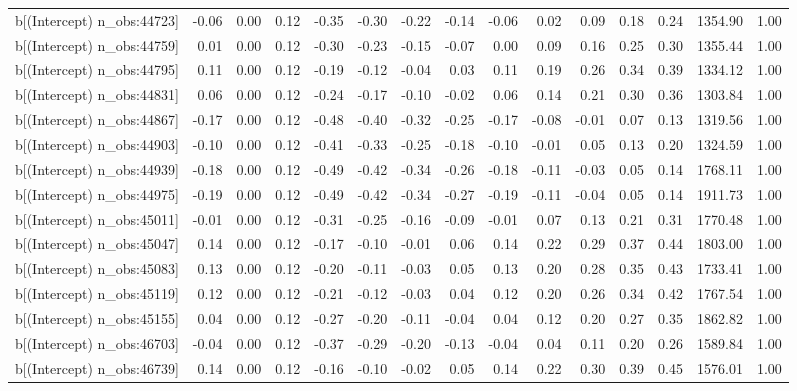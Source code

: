 \begin{table}[ht]
\begin{tabular}{rrrrrrrrrrrrrrr}
  b[(Intercept) n\_obs:44723] & -0.06 & 0.00 & 0.12 & -0.35 & -0.30 & -0.22 & -0.14 & -0.06 & 0.02 & 0.09 & 0.18 & 0.24 & 1354.90 & 1.00 \\ 
  b[(Intercept) n\_obs:44759] & 0.01 & 0.00 & 0.12 & -0.30 & -0.23 & -0.15 & -0.07 & 0.00 & 0.09 & 0.16 & 0.25 & 0.30 & 1355.44 & 1.00 \\ 
  b[(Intercept) n\_obs:44795] & 0.11 & 0.00 & 0.12 & -0.19 & -0.12 & -0.04 & 0.03 & 0.11 & 0.19 & 0.26 & 0.34 & 0.39 & 1334.12 & 1.00 \\ 
  b[(Intercept) n\_obs:44831] & 0.06 & 0.00 & 0.12 & -0.24 & -0.17 & -0.10 & -0.02 & 0.06 & 0.14 & 0.21 & 0.30 & 0.36 & 1303.84 & 1.00 \\ 
  b[(Intercept) n\_obs:44867] & -0.17 & 0.00 & 0.12 & -0.48 & -0.40 & -0.32 & -0.25 & -0.17 & -0.08 & -0.01 & 0.07 & 0.13 & 1319.56 & 1.00 \\ 
  b[(Intercept) n\_obs:44903] & -0.10 & 0.00 & 0.12 & -0.41 & -0.33 & -0.25 & -0.18 & -0.10 & -0.01 & 0.05 & 0.13 & 0.20 & 1324.59 & 1.00 \\ 
  b[(Intercept) n\_obs:44939] & -0.18 & 0.00 & 0.12 & -0.49 & -0.42 & -0.34 & -0.26 & -0.18 & -0.11 & -0.03 & 0.05 & 0.14 & 1768.11 & 1.00 \\ 
  b[(Intercept) n\_obs:44975] & -0.19 & 0.00 & 0.12 & -0.49 & -0.42 & -0.34 & -0.27 & -0.19 & -0.11 & -0.04 & 0.05 & 0.14 & 1911.73 & 1.00 \\ 
  b[(Intercept) n\_obs:45011] & -0.01 & 0.00 & 0.12 & -0.31 & -0.25 & -0.16 & -0.09 & -0.01 & 0.07 & 0.13 & 0.21 & 0.31 & 1770.48 & 1.00 \\ 
  b[(Intercept) n\_obs:45047] & 0.14 & 0.00 & 0.12 & -0.17 & -0.10 & -0.01 & 0.06 & 0.14 & 0.22 & 0.29 & 0.37 & 0.44 & 1803.00 & 1.00 \\ 
  b[(Intercept) n\_obs:45083] & 0.13 & 0.00 & 0.12 & -0.20 & -0.11 & -0.03 & 0.05 & 0.13 & 0.20 & 0.28 & 0.35 & 0.43 & 1733.41 & 1.00 \\ 
  b[(Intercept) n\_obs:45119] & 0.12 & 0.00 & 0.12 & -0.21 & -0.12 & -0.03 & 0.04 & 0.12 & 0.20 & 0.26 & 0.34 & 0.42 & 1767.54 & 1.00 \\ 
  b[(Intercept) n\_obs:45155] & 0.04 & 0.00 & 0.12 & -0.27 & -0.20 & -0.11 & -0.04 & 0.04 & 0.12 & 0.20 & 0.27 & 0.35 & 1862.82 & 1.00 \\ 
  b[(Intercept) n\_obs:46703] & -0.04 & 0.00 & 0.12 & -0.37 & -0.29 & -0.20 & -0.13 & -0.04 & 0.04 & 0.11 & 0.20 & 0.26 & 1589.84 & 1.00 \\ 
  b[(Intercept) n\_obs:46739] & 0.14 & 0.00 & 0.12 & -0.16 & -0.10 & -0.02 & 0.05 & 0.14 & 0.22 & 0.30 & 0.39 & 0.45 & 1576.01 & 1.00 \\ 

\end{tabular}
\end{table}
